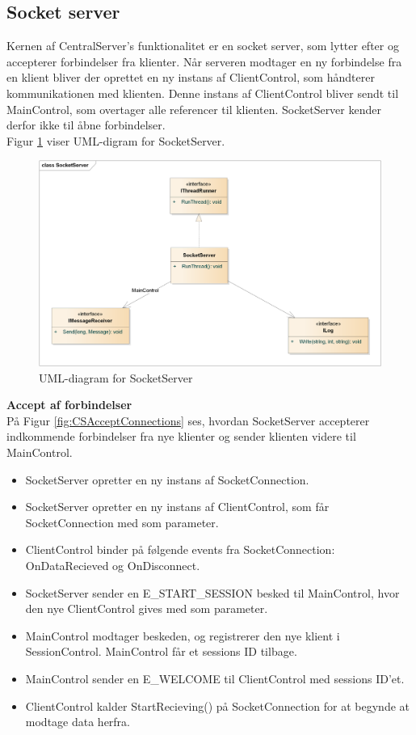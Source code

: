\subsection{Socket server}
Kernen af CentralServer’s funktionalitet er en socket server, som lytter efter og accepterer forbindelser fra klienter. Når serveren modtager en ny forbindelse fra en klient bliver der oprettet en ny instans af ClientControl, som håndterer kommunikationen med klienten. Denne instans af ClientControl bliver sendt til MainControl, som overtager alle referencer til klienten. SocketServer kender derfor ikke til åbne forbindelser.\\

Figur \ref{fig:CSSocketServer} viser UML-digram for SocketServer.


\begin{figure}[H]
    \centering
    \includegraphics[width=1\textwidth]{Systemdesign/CentralServer/Images/SocketServer.png}
    \caption{UML-diagram for SocketServer}
    \label{fig:CSSocketServer}
\end{figure}


\textbf{Accept af forbindelser}\\
På Figur \ref{fig:CSAcceptConnections} ses, hvordan SocketServer accepterer indkommende forbindelser fra nye klienter og sender klienten videre til MainControl.

\begin{itemize}
  \item SocketServer opretter en ny instans af SocketConnection.
  \item SocketServer opretter en ny instans af ClientControl, som får SocketConnection med som parameter.
  \item ClientControl binder på følgende events fra SocketConnection: OnDataRecieved og OnDisconnect.
  \item SocketServer sender en E\_START\_SESSION besked til MainControl, hvor den nye ClientControl gives med som parameter.
  \item MainControl modtager beskeden, og registrerer den nye klient i SessionControl. MainControl får et sessions ID tilbage.
  \item MainControl sender en E\_WELCOME til ClientControl med sessions ID'et.
  \item ClientControl kalder StartRecieving() på SocketConnection for at begynde at modtage data herfra.
\end{itemize}

